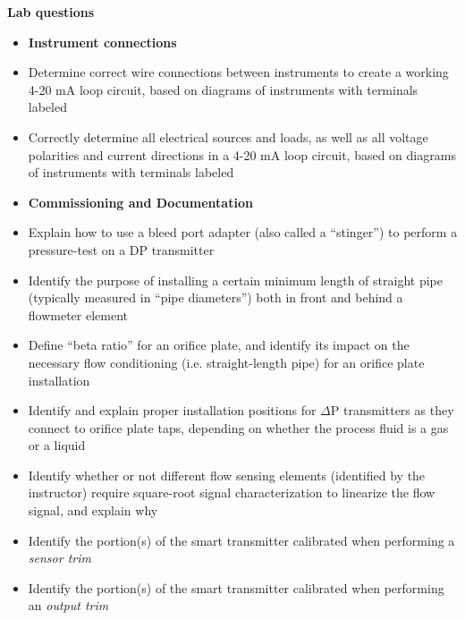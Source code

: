 \vfil \eject

\noindent
{\bf Lab questions}

\vskip 5pt

\begin{itemize}
\item{} {\bf Instrument connections}
\item{} Determine correct wire connections between instruments to create a working 4-20 mA loop circuit, based on diagrams of instruments with terminals labeled
\item{} Correctly determine all electrical sources and loads, as well as all voltage polarities and current directions in a 4-20 mA loop circuit, based on diagrams of instruments with terminals labeled
\end{itemize}

\filbreak

\begin{itemize}
\item{} {\bf Commissioning and Documentation}
\item{} Explain how to use a bleed port adapter (also called a ``stinger'') to perform a pressure-test on a DP transmitter
\item{} Identify the purpose of installing a certain minimum length of straight pipe (typically measured in ``pipe diameters'') both in front and behind a flowmeter element
\item{} Define ``beta ratio'' for an orifice plate, and identify its impact on the necessary flow conditioning (i.e. straight-length pipe) for an orifice plate installation
\item{} Identify and explain proper installation positions for $\Delta$P transmitters as they connect to orifice plate taps, depending on whether the process fluid is a gas or a liquid
\item{} Identify whether or not different flow sensing elements (identified by the instructor) require square-root signal characterization to linearize the flow signal, and explain why
\item{} Identify the portion(s) of the smart transmitter calibrated when performing a {\it sensor trim}
\item{} Identify the portion(s) of the smart transmitter calibrated when performing an {\it output trim}
\end{itemize}

\filbreak

